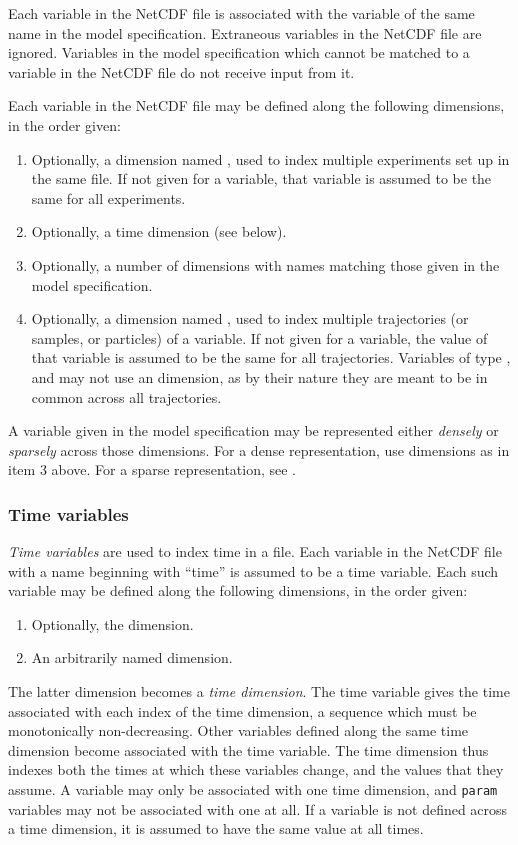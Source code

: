 Each variable in the NetCDF file is associated with the variable of the same
name in the model specification. Extraneous variables in the NetCDF file are
ignored. Variables in the model specification which cannot be matched to a
variable in the NetCDF file do not receive input from it.

Each variable in the NetCDF file may be defined along the following
dimensions, in the order given:
\begin{enumerate}
\item Optionally, a dimension named , used to index multiple
  experiments set up in the same file. If not given for a variable, that
  variable is assumed to be the same for all experiments.
\item Optionally, a time dimension (see below).
\item Optionally, a number of dimensions with names matching those given in
  the model specification.
\item Optionally, a dimension named , used to index multiple
  trajectories (or samples, or particles) of a variable. If not given for a
  variable, the value of that variable is assumed to be the same for all
  trajectories. Variables of type ,  and 
  may not use an  dimension, as by their nature they are meant to be
  in common across all trajectories.
\end{enumerate}

A variable given in the model specification may be represented either
\emph{densely} or \emph{sparsely} across those dimensions. For a dense
representation, use dimensions as in item 3 above. For a sparse
representation, see .

\subsubsection{Time variables\label{Time_variables}}

\emph{Time variables} are used to index time in a file. Each variable in the
NetCDF file with a name beginning with ``time'' is assumed to be a time
variable. Each such variable may be defined along the following dimensions, in
the order given:
\begin{enumerate}
\item Optionally, the  dimension.
\item An arbitrarily named dimension.
\end{enumerate}
The latter dimension becomes a \emph{time dimension}. The time variable gives the time associated with each index of
the time dimension, a sequence which must be monotonically
non-decreasing. Other variables defined along the same time dimension become
associated with the time variable. The time dimension thus indexes both the
times at which these variables change, and the values that they assume. A
variable may only be associated with one time dimension, and \texttt{param}
variables may not be associated with one at all. If a variable is not defined
across a time dimension, it is assumed to have the same value at all times.

